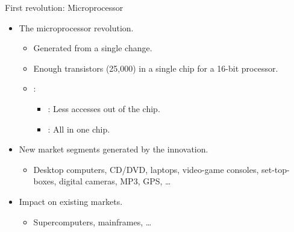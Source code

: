 \begin{frame}[t]{First revolution: Microprocessor}
\begin{itemize}
  \item The microprocessor revolution.
    \begin{itemize}
      \item Generated from a single change.
      \item Enough transistors (25,000) in a single chip for a 16-bit processor.
      \item {}:
        \begin{itemize}
          \item {}: Less accesses out of the chip.
          \item {}: All in one chip.
        \end{itemize}
    \end{itemize}
  \item New market segments generated by the innovation.
    \begin{itemize}
      \item Desktop computers, CD/DVD, laptops, video-game consoles, set-top-boxes,
            digital cameras, MP3, GPS, \ldots
    \end{itemize}
  \item Impact on existing markets.
    \begin{itemize}
      \item Supercomputers, mainframes, \ldots
    \end{itemize}
\end{itemize}
\end{frame}

